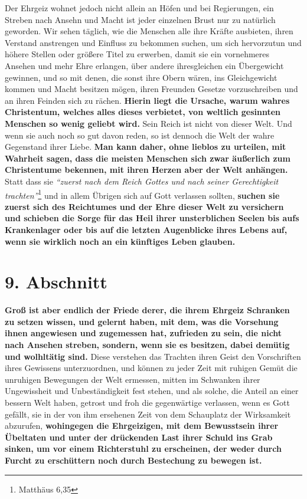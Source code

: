 Der Ehrgeiz wohnet jedoch nicht allein an Höfen und bei Regierungen, ein Streben
nach Ansehn und Macht ist jeder einzelnen Brust nur zu natürlich geworden. Wir
sehen täglich, wie die Menschen alle ihre Kräfte ausbieten, ihren Verstand
anstrengen und Einfluss zu bekommen suchen, um sich hervorzutun und höhere
Stellen oder größere Titel zu erwerben, damit sie ein vornehmeres Ansehen und
mehr Ehre erlangen, über andere ihresgleichen ein Übergewicht gewinnen, und so
mit denen, die sonst ihre Obern wären, ins Gleichgewicht kommen und Macht
besitzen mögen, ihren Freunden Gesetze vorzuschreiben und an ihren Feinden sich
zu rächen.
\label{ref:08_08_reich_gottes} \textbf{Hierin liegt die Ursache, warum wahres
Christentum, welches alles
dieses verbietet, von weltlich gesinnten Menschen so wenig geliebt wird.} Sein
Reich ist nicht von dieser Welt.
Und wenn sie auch noch so gut davon reden, so
ist dennoch die Welt der wahre Gegenstand ihrer Liebe. \textbf{Man kann daher,
ohne
lieblos zu urteilen, mit Wahrheit sagen, dass die meisten Menschen sich zwar
äußerlich zum Christentume bekennen, mit ihren Herzen aber der
Welt anhängen.}
Statt dass sie
\textit{"`zuerst nach dem Reich Gottes und nach seiner Gerechtigkeit
trachten"'}\footnote{Matthäus 6,35}
und in allem Übrigen sich auf Gott verlassen
sollten, \textbf{suchen sie zuerst sich des Reichtumes und der Ehre dieser Welt
zu
versichern und schieben die Sorge für das Heil ihrer unsterblichen Seelen bis
aufs Krankenlager oder bis auf die letzten Augenblicke ihres Lebens auf, wenn
sie wirklich noch an ein künftiges Leben glauben.}

\section{9. Abschnitt} \label{kap8_ab9}

\label{ref:08_09_friedem} \textbf{Groß ist aber endlich der Friede derer,
die ihrem Ehrgeiz Schranken zu setzen wissen, und gelernt haben, mit dem, was
die Vorsehung ihnen angewiesen und
zugemessen hat, zufrieden zu sein,
die nicht nach Ansehen streben, sondern, wenn
sie es besitzen, dabei demütig und wolhltätig sind.} Diese verstehen das
Trachten ihren Geist den Vorschriften ihres Gewissens unterzuordnen, und
können zu jeder Zeit mit ruhigen Gemüt die unruhigen Bewegungen der Welt
ermessen, mitten im Schwanken ihrer Ungewissheit und Unbeständigkeit fest
stehen,
und als solche, die Anteil an einer bessern Welt haben, getrost und froh die
gegenwärtige verlassen, wenn es Gott gefällt, sie in der von ihm
ersehenen Zeit
von dem Schauplatz der Wirksamkeit abzurufen, \textbf{wohingegen die
Ehrgeizigen, mit
dem Bewusstsein ihrer Übeltaten und unter der drückenden Last ihrer
Schuld ins
Grab sinken, um vor einem Richterstuhl  zu erscheinen,
der weder durch Furcht zu
erschüttern noch durch Bestechung zu bewegen ist.}

